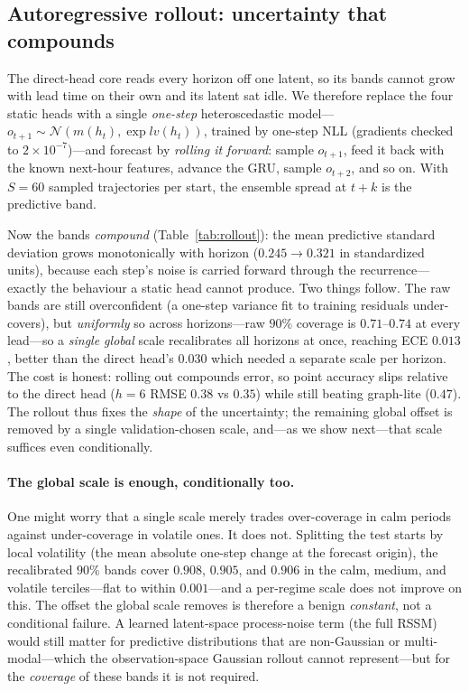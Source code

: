 \documentclass[10pt]{article}
\begin{document}
\subsection{Autoregressive rollout: uncertainty that compounds}
\label{sec:rollout}
The direct-head core reads every horizon off one latent, so its bands cannot grow
with lead time on their own and its latent sat idle. We therefore replace the four
static heads with a single \emph{one-step} heteroscedastic model---$o_{t+1}\sim
\mathcal{N}(m(h_t),\exp lv(h_t))$, trained by one-step NLL (gradients checked to
$2\times10^{-7}$)---and forecast by \emph{rolling it forward}: sample $o_{t+1}$,
feed it back with the known next-hour features, advance the GRU, sample $o_{t+2}$,
and so on. With $S=60$ sampled trajectories per start, the ensemble spread at $t+k$
is the predictive band.

Now the bands \emph{compound} (Table~\ref{tab:rollout}): the mean predictive
standard deviation grows monotonically with horizon ($0.245\!\to\!0.321$ in
standardized units), because each step's noise is carried forward through the
recurrence---exactly the behaviour a static head cannot produce. Two things follow.
The raw bands are still overconfident (a one-step variance fit to training residuals
under-covers), but \emph{uniformly} so across horizons---raw $90\%$ coverage is
$0.71$--$0.74$ at every lead---so a \emph{single global} scale recalibrates all
horizons at once, reaching ECE $0.013$, better than the direct head's $0.030$ which
needed a separate scale per horizon. The cost is honest: rolling out compounds
error, so point accuracy slips relative to the direct head ($h=6$ RMSE $0.38$ vs
$0.35$) while still beating graph-lite ($0.47$). The rollout thus fixes the
\emph{shape} of the uncertainty; the remaining global offset is removed by a single
validation-chosen scale, and---as we show next---that scale suffices even
conditionally.

\paragraph{The global scale is enough, conditionally too.}
One might worry that a single scale merely trades over-coverage in calm periods
against under-coverage in volatile ones. It does not. Splitting the test starts by
local volatility (the mean absolute one-step change at the forecast origin), the
recalibrated $90\%$ bands cover $0.908$, $0.905$, and $0.906$ in the calm, medium,
and volatile terciles---flat to within $0.001$---and a per-regime scale does not
improve on this. The offset the global scale removes is therefore a benign
\emph{constant}, not a conditional failure. A learned latent-space process-noise
term (the full RSSM) would still matter for predictive distributions that are
non-Gaussian or multi-modal---which the observation-space Gaussian rollout cannot
represent---but for the \emph{coverage} of these bands it is not required.
\end{document}
